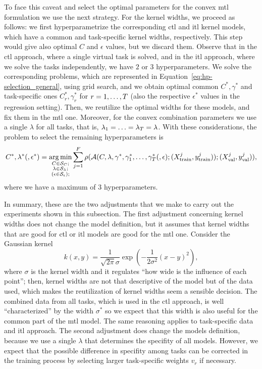 To face this caveat and select the optimal parameters for the convex \acrshort{mtl} formulation we use the next strategy.
%
For the kernel widths, we proceed as follows: we first hyperparametrize the corresponding \acrshort{ctl} and \acrshort{itl} kernel models, which have a common and task-specific kernel widths, respectively. 
This step would give also optimal $C$ and $\epsilon$ values, but we discard them.
Observe that in the \acrshort{ctl} approach, where a single virtual task is solved, and in the \acrshort{itl} approach, where we solve the tasks independently, we have $2$ or $3$ hyperparameters. We solve the corresponding problems, which are represented in Equation~\eqref{eq:hp-selection_general}, using grid search, and we obtain optimal common $C^*, \gamma^*$ and task-specific ones $C_r^*, \gamma^*_r$ for $r=1, \ldots, T$ (also the respective $\epsilon^*$ values in the regression setting).
Then, we reutilize the optimal widths for these models, and fix them in the \acrshort{mtl} one.
%
Moreover, for the convex combination parameters we use a single $\lambda$ for all tasks, that is, $\lambda_1 = \ldots = \lambda_T = \lambda$.
%
With these considerations, the problem to select the remaining hyperparameters is 
\begin{equation}
    \nonumber
    C^*, \lambda^* (, \epsilon^*) = \operatorname*{arg\min}_{\substack{C \in \mathcal{S}_C ; \\ \substack{\lambda \in \mathcal{S}_\lambda} ; \\ \left(\substack{\epsilon \in \mathcal{S}_\epsilon} \right); }}
     \sum_{j=1}^{F} \rho(\mathcal{A}(C, \lambda, \gamma^*, \gamma_1^*, \ldots, \gamma_T^* (, \epsilon); (X^j_\text{train}, y^j_\text{train})); (X^j_\text{val}, y^j_\text{val})) ,
\end{equation}
where we have a maximum of $3$ hyperparameters.

%
In summary, these are the two adjustments that we make to carry out the experiments shown in this subsection.
The first adjustment concerning kernel widths does not change the model definition, but it assumes that kernel widths that are good for \acrshort{ctl} or \acrshort{itl} models are good for the \acrshort{mtl} one. 
Consider the Gaussian kernel
\begin{equation}
    \nonumber
    k(x, y) = \frac{1}{\sqrt{2\pi} \sigma}\exp{\left(-\frac{1}{2\sigma^2} (x-y)^2\right)},
\end{equation}
where $\sigma$ is the kernel width and it regulates ``how wide is the influence of each point'';
then, kernel widths are not that descriptive of the model but of the data used, which makes the reutilization of kernel widths seem a sensible decision.
The combined data from all tasks, which is used in the \acrshort{ctl} approach, is well ``characterized'' by the width $\sigma^*$ so we expect that this width is also useful for the common part of the \acrshort{mtl} model. The same reasoning applies to task-specific data and \acrshort{itl} approach.
%
The second adjustment does change the models definition, because we use a single $\lambda$ that determines the specifity of all models. However, we expect that the possible difference in specifity among tasks can be corrected in the training process by selecting larger task-specific weights $v_r$ if necessary.

